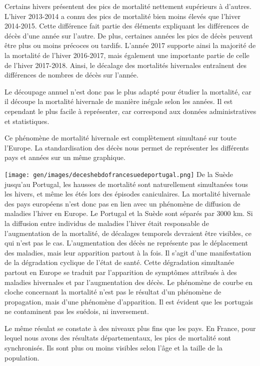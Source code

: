 \documentclass[
]{article}
\begin{document}
Certains hivers présentent des pics de mortalité nettement supérieurs à
d'autres. L'hiver 2013-2014 a connu des pics de mortalité bien moins
élevés que l'hiver 2014-2015. Cette différence fait partie des éléments
expliquant les différences de décès d'une année sur l'autre. De plus,
certaines années les pics de décès peuvent être plus ou moins précoces
ou tardifs. L'année 2017 supporte ainsi la majorité de la mortalité de
l'hiver 2016-2017, mais également une importante partie de celle de
l'hiver 2017-2018. Ainsi, le décalage des mortalités hivernales
entraînent des différences de nombres de décès sur l'année.

Le découpage annuel n'est donc pas le plus adapté pour étudier la
mortalité, car il découpe la mortalité hivernale de manière inégale
selon les années. Il est cependant le plus facile à représenter, car
correspond aux données administratives et statistiques.

Ce phénomène de mortalité hivernale est complètement simultané sur toute
l'Europe. La standardisation des décès nous permet de représenter les
différents pays et années sur un même graphique.

\texttt{[image: gen/images/deceshebdofrancesuedeportugal.png]}
De la Suède jusqu'au Portugal, les hausses de mortalité sont
naturellement simultanées tous les hivers, et même les étés lors des
épisodes caniculaires. La mortalité hivernale des pays européens n'est
donc pas en lien avec un phénomène de diffusion de maladies l'hiver en
Europe. Le Portugal et la Suède sont séparés par 3000 km. Si la
diffusion entre individus de maladies l'hiver était responsable de
l'augmentation de la mortalité, de décalages temporels devraient être
visibles, ce qui n'est pas le cas. L'augmentation des décès ne
représente pas le déplacement des maladies, mais leur apparition partout
à la fois. Il s'agit d'une manifestation de la dégradation cyclique de
l'état de santé. Cette dégradation simultanée partout en Europe se
traduit par l'apparition de symptômes attribués à des maladies
hivernales et par l'augmentation des décès. Le phénomène de courbe en
cloche concernant la mortalité n'est pas le résultat d'un phénomène de
propagation, mais d'une phénomène d'apparition. Il est évident que les
portugais ne contaminent pas les suédois, ni inversement.

Le même résulat se constate à des niveaux plus fins que les pays. En
France, pour lequel nous avons des résultats départementaux, les pics de
mortalité sont synchronisés. Ils sont plus ou moins visibles selon l'âge
et la taille de la population.
\end{document}
